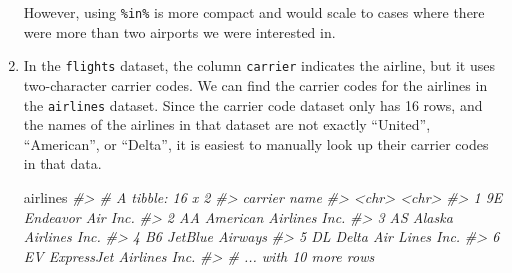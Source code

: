 \documentclass[]{book}
\newenvironment{Shaded}{\begin{snugshade}}{\end{snugshade}}
\newcommand{\CommentTok}[1]{\textcolor[rgb]{0.56,0.35,0.01}{\textit{#1}}}
\newcommand{\KeywordTok}[1]{\textcolor[rgb]{0.13,0.29,0.53}{\textbf{#1}}}
\newcommand{\NormalTok}[1]{#1}
\newcommand{\OperatorTok}[1]{\textcolor[rgb]{0.81,0.36,0.00}{\textbf{#1}}}
\newcommand{\StringTok}[1]{\textcolor[rgb]{0.31,0.60,0.02}{#1}}
\theoremstyle{plain}
\theoremstyle{remark}
\begin{document}
\begin{enumerate}
  However, using \texttt{\%in\%} is more compact and would scale to cases where
  there were more than two airports we were interested in.

\begin{Shaded}
\end{Shaded}
\item
  In the \texttt{flights} dataset, the column \texttt{carrier} indicates the airline, but it uses two-character carrier codes.
  We can find the carrier codes for the airlines in the \texttt{airlines} dataset.
  Since the carrier code dataset only has 16 rows, and the names
  of the airlines in that dataset are not exactly ``United'', ``American'', or ``Delta'',
  it is easiest to manually look up their carrier codes in that data.

\begin{Shaded}
\begin{Highlighting}[]
\NormalTok{airlines}
\CommentTok{#> # A tibble: 16 x 2}
\CommentTok{#>   carrier name                    }
\CommentTok{#>   <chr>   <chr>                   }
\CommentTok{#> 1 9E      Endeavor Air Inc.       }
\CommentTok{#> 2 AA      American Airlines Inc.  }
\CommentTok{#> 3 AS      Alaska Airlines Inc.    }
\CommentTok{#> 4 B6      JetBlue Airways         }
\CommentTok{#> 5 DL      Delta Air Lines Inc.    }
\CommentTok{#> 6 EV      ExpressJet Airlines Inc.}
\CommentTok{#> # ... with 10 more rows}
\end{Highlighting}
\end{Shaded}


\end{enumerate}
\end{document}
